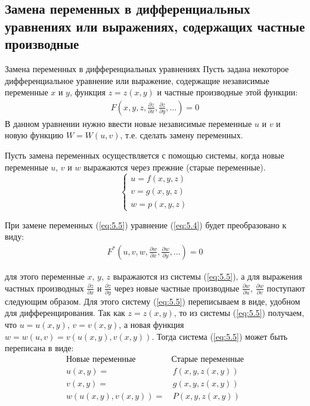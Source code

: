 \subsection{Замена переменных в дифференциальных уравнениях или выражениях, содержащих частные производные}

\begin{tbox}{Замена переменных в дифференциальных уравнениях}
	Пусть задана некоторое дифференциальное уравнение или выражение, содержащие независимые переменные $x$ и $y$, функция $z = z(x,y)$ и частные производные этой функции:
	\begin{align} \label{eq:5.4}
		F(x,y,z, \frac{\partial z}{\partial x}, \frac{\partial z}{\partial y}, \dots) = 0
	\end{align}
	В данном уравнении нужно ввести новые независимые переменные $u$ и $v$ и новую функцию $W = W(u,v)$, т.е. сделать замену переменных.

	Пусть замена переменных осуществляется с помощью системы, когда новые переменные $u$, $v$ и $w$ выражаются через прежние (старые переменные).
	\begin{equation} \label{eq:5.5}
		\begin{cases}
			u = f(x,y,z)\\
			v = g(x,y,z)\\
			w = p(x,y,z)
		\end{cases}
	\end{equation}

	При замене переменных (\ref{eq:5.5}) уравнение (\ref{eq:5.4}) будет преобразовано к виду:
	\begin{align} \label{eq:5.6}
		F^*(u,v,w, \frac{\partial w}{\partial x}, \frac{\partial w}{\partial y}, \dots) = 0
	\end{align}

	для этого переменные $x$, $y$, $z$ выражаются из системы (\ref{eq:5.5}), а для выражения частных производных $\frac{\partial z}{\partial x}$ и $\frac{\partial z}{\partial y}$ через новые частные производные $\frac{\partial w}{\partial u}$, $\frac{\partial w}{\partial v}$ поступают следующим образом. Для этого систему (\ref{eq:5.5}) переписываем в виде, удобном для дифференцирования. Так как $z = z(x,y)$, то из системы (\ref{eq:5.5}) получаем, что $u = u(x,y)$, $v = v(x,y)$, а новая функция $w = w(u,v) = v(u(x,y), v(x,y))$. Тогда система (\ref{eq:5.5}) может быть переписана в виде:
	\begin{equation} \label{eq:5.7}
		\begin{split}
			\text{Новые переменные} \quad & \text{Старые переменные}\\
			u(x,y) =& \, f(x,y,z(x,y))\\
			v(x,y) =& \, g(x,y,z(x,y))\\
			w(u(x,y), v(x,y)) =& \, P(x,y,z(x,y))
		\end{split}
	\end{equation}
\end{tbox}

